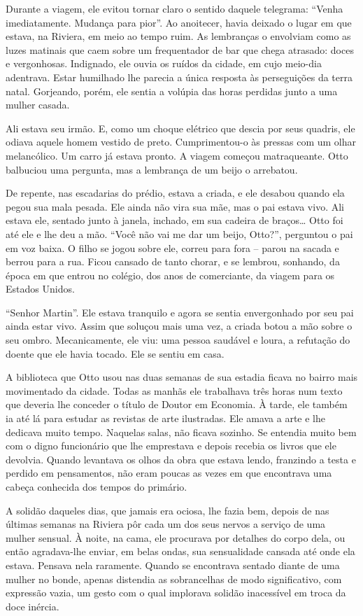 Durante a viagem, ele evitou tornar claro o sentido daquele telegrama:
``Venha imediatamente. Mudança para pior''. Ao anoitecer, havia deixado
o lugar em que estava, na Riviera, em meio ao tempo ruim. As lembranças
o envolviam como as luzes matinais que caem sobre um frequentador de bar
que chega atrasado: doces e vergonhosas. Indignado, ele ouvia os ruídos
da cidade, em cujo meio-dia adentrava. Estar humilhado lhe parecia a
única resposta às perseguições da terra natal. Gorjeando, porém, ele
sentia a volúpia das horas perdidas junto a uma mulher casada.

Ali estava seu irmão. E, como um choque elétrico que descia por seus
quadris, ele odiava aquele homem vestido de preto. Cumprimentou-o às
pressas com um olhar melancólico. Um carro já estava pronto. A viagem
começou matraqueante. Otto balbuciou uma pergunta, mas a lembrança de um
beijo o arrebatou.

De repente, nas escadarias do prédio, estava a criada, e ele desabou
quando ela pegou sua mala pesada. Ele ainda não vira sua mãe, mas o pai
estava vivo. Ali estava ele, sentado junto à janela, inchado, em sua
cadeira de braços\ldots{} Otto foi até ele e lhe deu a mão. ``Você não vai me
dar um beijo, Otto?'', perguntou o pai em voz baixa. O filho se jogou
sobre ele, correu para fora -- parou na sacada e berrou para a rua.
Ficou cansado de tanto chorar, e se lembrou, sonhando, da época em que
entrou no colégio, dos anos de comerciante, da viagem para os Estados
Unidos.

``Senhor Martin''. Ele estava tranquilo e agora se sentia envergonhado
por seu pai ainda estar vivo. Assim que soluçou mais uma vez, a criada
botou a mão sobre o seu ombro. Mecanicamente, ele viu: uma pessoa
saudável e loura, a refutação do doente que ele havia tocado. Ele se
sentiu em casa.

A biblioteca que Otto usou nas duas semanas de sua estadia ficava no
bairro mais movimentado da cidade. Todas as manhãs ele trabalhava três
horas num texto que deveria lhe conceder o título de Doutor em Economia.
À tarde, ele também ia até lá para estudar as revistas de arte
ilustradas. Ele amava a arte e lhe dedicava muito tempo. Naquelas salas,
não ficava sozinho. Se entendia muito bem com o digno funcionário que
lhe emprestava e depois recebia os livros que ele devolvia. Quando
levantava os olhos da obra que estava lendo, franzindo a testa e perdido
em pensamentos, não eram poucas as vezes em que encontrava uma cabeça
conhecida dos tempos do primário.

A solidão daqueles dias, que jamais era ociosa, lhe fazia bem, depois de
nas últimas semanas na Riviera pôr cada um dos seus nervos a serviço de
uma mulher sensual. À noite, na cama, ele procurava por detalhes do
corpo dela, ou então agradava-lhe enviar, em belas ondas, sua
sensualidade cansada até onde ela estava. Pensava nela raramente. Quando
se encontrava sentado diante de uma mulher no bonde, apenas distendia as
sobrancelhas de modo significativo, com expressão vazia, um gesto com o
qual implorava solidão inacessível em troca da doce inércia.

